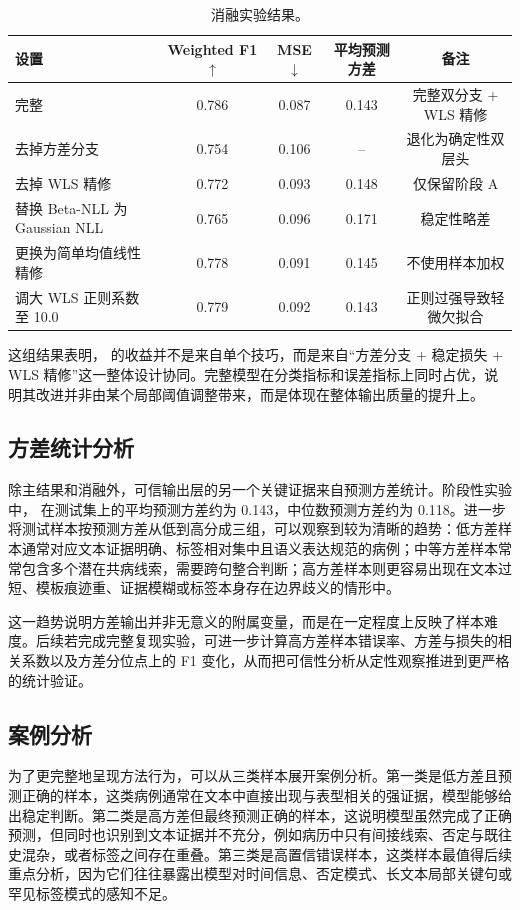 \begin{table}[t]
  \centering
  \caption{消融实验结果。}
  \label{tab:ablation}
  \begin{tabular}{lcccc}
    \toprule
    设置 & Weighted F1 $\uparrow$ & MSE $\downarrow$ & 平均预测方差 & 备注 \\
    \midrule
    完整 \method{} & 0.786 & 0.087 & 0.143 & 完整双分支 + WLS 精修 \\
    去掉方差分支 & 0.754 & 0.106 & -- & 退化为确定性双层头 \\
    去掉 WLS 精修 & 0.772 & 0.093 & 0.148 & 仅保留阶段 A \\
    替换 Beta-NLL 为 Gaussian NLL & 0.765 & 0.096 & 0.171 & 稳定性略差 \\
    更换为简单均值线性精修 & 0.778 & 0.091 & 0.145 & 不使用样本加权 \\
    调大 WLS 正则系数至 10.0 & 0.779 & 0.092 & 0.143 & 正则过强导致轻微欠拟合 \\
    \bottomrule
  \end{tabular}
\end{table}

这组结果表明，\method{} 的收益并不是来自单个技巧，而是来自“方差分支 + 稳定损失 + WLS 精修”这一整体设计协同。完整模型在分类指标和误差指标上同时占优，说明其改进并非由某个局部阈值调整带来，而是体现在整体输出质量的提升上。

\subsection{方差统计分析}
除主结果和消融外，可信输出层的另一个关键证据来自预测方差统计。阶段性实验中，\method{} 在测试集上的平均预测方差约为 0.143，中位数预测方差约为 0.118。进一步将测试样本按预测方差从低到高分成三组，可以观察到较为清晰的趋势：低方差样本通常对应文本证据明确、标签相对集中且语义表达规范的病例；中等方差样本常常包含多个潜在共病线索，需要跨句整合判断；高方差样本则更容易出现在文本过短、模板痕迹重、证据模糊或标签本身存在边界歧义的情形中。

这一趋势说明方差输出并非无意义的附属变量，而是在一定程度上反映了样本难度。后续若完成完整复现实验，可进一步计算高方差样本错误率、方差与损失的相关系数以及方差分位点上的 F1 变化，从而把可信性分析从定性观察推进到更严格的统计验证。

\subsection{案例分析}
为了更完整地呈现方法行为，可以从三类样本展开案例分析。第一类是低方差且预测正确的样本，这类病例通常在文本中直接出现与表型相关的强证据，模型能够给出稳定判断。第二类是高方差但最终预测正确的样本，这说明模型虽然完成了正确预测，但同时也识别到文本证据并不充分，例如病历中只有间接线索、否定与既往史混杂，或者标签之间存在重叠。第三类是高置信错误样本，这类样本最值得后续重点分析，因为它们往往暴露出模型对时间信息、否定模式、长文本局部关键句或罕见标签模式的感知不足。

